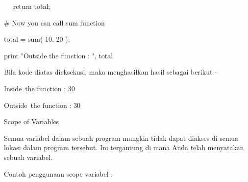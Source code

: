 \noindent 
 \hspace*{0.5in} ~~ return total; \par
\vspace{12pt}
\noindent 
 \hspace*{0.5in}  $  \#  $ Now you can call sum function \par
\noindent 
 \hspace*{0.5in} total = sum( 10, 20 ); \par
\noindent 
 \hspace*{0.5in} print "Outside the function : ", total  \par
\noindent 
Bila kode diatas dieksekusi, maka menghasilkan hasil sebagai berikut - \par
\noindent 
 \hspace*{0.5in} Inside~the function :  30 \par
\noindent 
 \hspace*{0.5in} Outside~the function :  30 \par
\noindent 
Scope of Variables \par
\noindent 
Semua variabel dalam sebuah program mungkin tidak dapat diakses di semua lokasi dalam program tersebut. Ini tergantung di mana Anda telah menyatakan sebuah variabel. \par
Contoh penggunaan scope variabel : 
